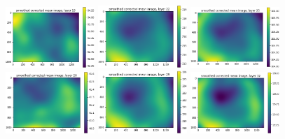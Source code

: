 \documentclass[letterpaper,11pt]{article}
\begin{document}
\begin{figure}[!ht]
\includegraphics[width=0.3\textwidth]{images/results/smoothed_corrected_mean_image_layers/smoothed_corrected_mean_image_layer_19}
\includegraphics[width=0.3\textwidth]{images/results/smoothed_corrected_mean_image_layers/smoothed_corrected_mean_image_layer_22}
\includegraphics[width=0.3\textwidth]{images/results/smoothed_corrected_mean_image_layers/smoothed_corrected_mean_image_layer_25}
\includegraphics[width=0.3\textwidth]{images/results/smoothed_corrected_mean_image_layers/smoothed_corrected_mean_image_layer_26}
\includegraphics[width=0.3\textwidth]{images/results/smoothed_corrected_mean_image_layers/smoothed_corrected_mean_image_layer_29}
\includegraphics[width=0.3\textwidth]{images/results/smoothed_corrected_mean_image_layers/smoothed_corrected_mean_image_layer_32}

\end{figure}
\end{document}
